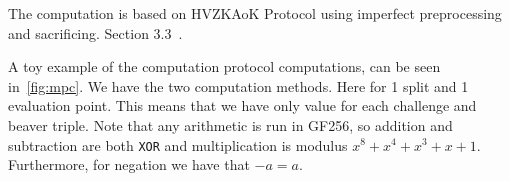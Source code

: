 \documentclass[11pt]{report}
\theoremstyle{definition}
\theoremstyle{plain}
\begin{document}
The computation is based on HVZKAoK Protocol using imperfect preprocessing and sacrificing. Section 3.3~\cite{baum2020concretely}.

A toy example of the computation protocol computations, can be seen in~\autoref{fig:mpc}. We have the two computation methods. Here for 1 split and 1 evaluation point. This means that we have only value for each challenge and beaver triple. Note that any arithmetic is run in GF256, so addition and subtraction are both \texttt{XOR} and multiplication is modulus $x^8 + x^4 + x^3 + x + 1$. Furthermore, for negation we have that $-a = a$.

\begin{figure}
\end{figure}
\end{document}
